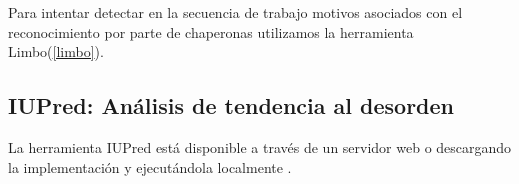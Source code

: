Para intentar detectar en la secuencia de trabajo motivos asociados con el reconocimiento por parte de chaperonas utilizamos la herramienta Limbo(\ref{limbo}). 






















\subsection{IUPred: Análisis de tendencia al desorden} \label{iupred}

La herramienta IUPred está disponible a través de un servidor web \cite{iupredWeb,dosztanyi2005iupred} o descargando la implementación y ejecutándola localmente \cite{iupredDownload}.   


